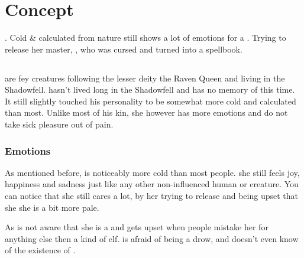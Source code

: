 \ifdm
    \chapter{Concept}
    \label{concept}

     \Race{}. Cold \& calculated from nature \Name{} still shows a lot of emotions for a \Race. Trying to release her master, \MasterFullName{}, who was cursed and turned into a spellbook.

    \section{\Race{}}
    \Race{} are fey creatures following the lesser deity the Raven Queen and living in the Shadowfell. \Name{} hasn't lived long in the Shadowfell and has no memory of this time. It still slightly touched his personality to be somewhat more cold and calculated than most. Unlike most of his kin, she however has more emotions and do not take sick pleasure out of pain.

    \subsection{Emotions}
    As mentioned before, \Name{} is noticeably more cold than most people. she still feels joy, happiness and sadness just like any other non-influenced human or creature. You can notice that she still cares a lot, by her trying to release \Master{} and being upset that she she is a bit more pale.

    As \Name{} is not aware that she is a \Race{} and gets upset when people mistake her for anything else then a kind of elf. \Name{} is afraid of being a drow, and doesn't even know of the existence of \Race{}.

